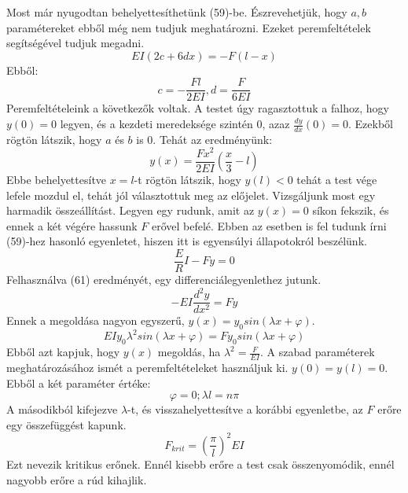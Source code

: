 \documentclass[a4paper,12pt]{article}
\begin{document}
Most már nyugodtan behelyettesíthetünk (59)-be. Észrevehetjük, hogy $a, b$ paramétereket ebből még nem tudjuk meghatározni. Ezeket peremfeltételek segítségével tudjuk megadni.
\begin{equation}
EI(2c+6dx)=-F(l-x)
\end{equation}
Ebből:
\begin{equation}
c=-\frac{Fl}{2EI}, d=\frac{F}{6EI}
\end{equation}
Peremfeltételeink a következők voltak. A testet úgy ragasztottuk a falhoz, hogy $y(0)=0$ legyen, és a kezdeti meredeksége szintén 0, azaz $\frac{dy}{dx}(0)=0$. Ezekből rögtön látszik, hogy $a$ és $b$ is 0. Tehát az eredményünk:
\begin{equation}
y(x)=\frac{Fx^2}{2EI}\left(\frac{x}{3}-l\right)
\end{equation}
Ebbe behelyettesítve $x=l$-t rögtön látszik, hogy $y(l)<0$ tehát a test vége lefele mozdul el, tehát jól választottuk meg az előjelet.
Vizsgáljunk most egy harmadik összeállítást. Legyen egy rudunk, amit az $y(x)=0$ síkon fekszik, és ennek a két végére hassunk $F$ erővel befelé. Ebben az esetben is fel tudunk írni (59)-hez hasonló egyenletet, hiszen itt is egyensúlyi állapotokról beszélünk.
\begin{equation}
\frac{E}{R}I-Fy=0
\end{equation}
Felhasználva (61) eredményét, egy differenciálegyenlethez jutunk.
\begin{equation}
-EI\frac{d^2y}{dx^2}=Fy
\end{equation}
Ennek a megoldása nagyon egyszerű, $y(x)=y_0sin(\lambda x+\varphi)$.
\begin{equation}
EIy_0\lambda^2sin(\lambda x+\varphi)=Fy_0sin(\lambda x+\varphi)
\end{equation}
Ebből azt kapjuk, hogy $y(x)$ megoldás, ha $\lambda^2=\frac{F}{EI}$. A szabad paraméterek meghatározásához ismét a peremfeltételeket használjuk ki. $y(0)=y(l)=0$. Ebből a két paraméter értéke:
\begin{equation}
\varphi=0;\lambda l=n\pi
\end{equation}
A másodikból kifejezve $\lambda$-t, és visszahelyettesítve a korábbi egyenletbe, az $F$ erőre egy összefüggést kapunk.
\begin{equation}
F_{krit}=\left(\frac{\pi}{l}\right)^2EI
\end{equation}
Ezt nevezik kritikus erőnek. Ennél kisebb erőre a test csak összenyomódik, ennél nagyobb erőre a rúd kihajlik.
\end{document}
